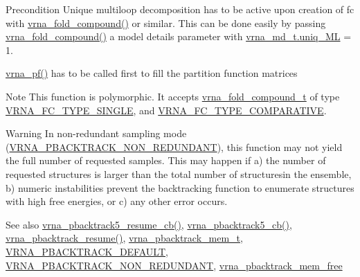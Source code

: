 \begin{DoxyPrecond}{Precondition}
Unique multiloop decomposition has to be active upon creation of {\ttfamily fc} with \mbox{\hyperlink{group__fold__compound_ga6601d994ba32b11511b36f68b08403be}{vrna\+\_\+fold\+\_\+compound()}} or similar. This can be done easily by passing \mbox{\hyperlink{group__fold__compound_ga6601d994ba32b11511b36f68b08403be}{vrna\+\_\+fold\+\_\+compound()}} a model details parameter with \mbox{\hyperlink{group__model__details_ade065b814a4e2e72ead93ab502613ed2}{vrna\+\_\+md\+\_\+t.\+uniq\+\_\+\+ML}} = 1. 

\mbox{\hyperlink{group__part__func__global_ga29e256d688ad221b78d37f427e0e99bc}{vrna\+\_\+pf()}} has to be called first to fill the partition function matrices
\end{DoxyPrecond}
\begin{DoxyNote}{Note}
This function is polymorphic. It accepts \mbox{\hyperlink{group__fold__compound_ga1b0cef17fd40466cef5968eaeeff6166}{vrna\+\_\+fold\+\_\+compound\+\_\+t}} of type \mbox{\hyperlink{group__fold__compound_gga01a4ff86fa71deaaa5d1abbd95a1447da7e264dd3cf2dc9b6448caabcb7763cd6}{V\+R\+N\+A\+\_\+\+F\+C\+\_\+\+T\+Y\+P\+E\+\_\+\+S\+I\+N\+G\+LE}}, and \mbox{\hyperlink{group__fold__compound_gga01a4ff86fa71deaaa5d1abbd95a1447dab821ce46ea3cf665be97df22a76f5023}{V\+R\+N\+A\+\_\+\+F\+C\+\_\+\+T\+Y\+P\+E\+\_\+\+C\+O\+M\+P\+A\+R\+A\+T\+I\+VE}}.
\end{DoxyNote}
\begin{DoxyWarning}{Warning}
In non-\/redundant sampling mode (\mbox{\hyperlink{group__subopt__stochbt_ga9d580ce645aa0c38b69afdf56c332200}{V\+R\+N\+A\+\_\+\+P\+B\+A\+C\+K\+T\+R\+A\+C\+K\+\_\+\+N\+O\+N\+\_\+\+R\+E\+D\+U\+N\+D\+A\+NT}}), this function may not yield the full number of requested samples. This may happen if a) the number of requested structures is larger than the total number of structuresin the ensemble, b) numeric instabilities prevent the backtracking function to enumerate structures with high free energies, or c) any other error occurs.
\end{DoxyWarning}
\begin{DoxySeeAlso}{See also}
\mbox{\hyperlink{group__subopt__stochbt_ga4a91dc092580faf7799476e8dd76e0ac}{vrna\+\_\+pbacktrack5\+\_\+resume\+\_\+cb()}}, \mbox{\hyperlink{group__subopt__stochbt_ga626beb5b5b962d7e7c8433cd2cfd4e93}{vrna\+\_\+pbacktrack5\+\_\+cb()}}, \mbox{\hyperlink{group__subopt__stochbt_gae175129ece546fe7c092f27072e039d1}{vrna\+\_\+pbacktrack\+\_\+resume()}}, \mbox{\hyperlink{group__subopt__stochbt_gaa59c30efbed96bf9aaf8005584c72e63}{vrna\+\_\+pbacktrack\+\_\+mem\+\_\+t}}, \mbox{\hyperlink{group__subopt__stochbt_ga760aa2fb2d5e3d7521a11454a21e9b9f}{V\+R\+N\+A\+\_\+\+P\+B\+A\+C\+K\+T\+R\+A\+C\+K\+\_\+\+D\+E\+F\+A\+U\+LT}}, \mbox{\hyperlink{group__subopt__stochbt_ga9d580ce645aa0c38b69afdf56c332200}{V\+R\+N\+A\+\_\+\+P\+B\+A\+C\+K\+T\+R\+A\+C\+K\+\_\+\+N\+O\+N\+\_\+\+R\+E\+D\+U\+N\+D\+A\+NT}}, \mbox{\hyperlink{group__subopt__stochbt_gae64fbdef59e7f503d7e920aac279212b}{vrna\+\_\+pbacktrack\+\_\+mem\+\_\+free}}
\end{DoxySeeAlso}

